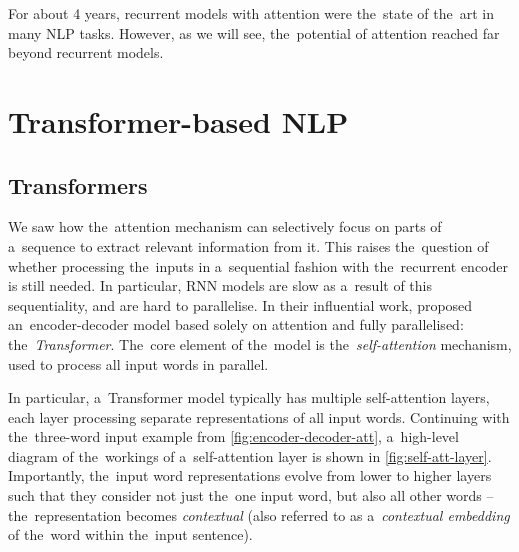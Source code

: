 \documentclass[bsc,frontabs,singlespacing,parskip,deptreport]{infthesis}
\begin{document}
{{    For about 4 years, recurrent models with attention were the~state of the~art in many NLP tasks. However, as we will see, the~potential of attention reached far beyond recurrent models.
  }

  \section{Transformer-based NLP}{
    \label{sec:Transformer-based-NLP}
    \subsection{Transformers}{
      \label{sec:Transformers}
      We saw how the~attention mechanism can selectively focus on parts of a~sequence to extract relevant information from it. This raises the~question of whether processing the~inputs in a~sequential fashion with the~recurrent encoder is still needed. In particular, RNN models are slow as a~result of this sequentiality, and are hard to parallelise. In their influential work, \citet{Vaswani_2017} proposed an~encoder-decoder model based solely on attention and fully parallelised: the~\textit{Transformer}. The~core element of the~model is the~\textit{self-attention} mechanism, used to process all input words in parallel.

      In particular, a~Transformer model typically has multiple self-attention layers, each layer processing separate representations of all input words. Continuing with the~three-word input example from \autoref{fig:encoder-decoder-att}, a~high-level diagram of the~workings of a~self-attention layer is shown in \autoref{fig:self-att-layer}. Importantly, the~input word representations evolve from lower to higher layers such that they consider not just the~one input word, but also all other words -- the~representation becomes \textit{contextual} (also referred to as a~\textit{contextual embedding} of the~word within the~input sentence).

}}}
\end{document}
